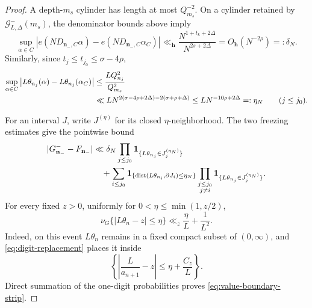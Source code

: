 \documentclass[11pt]{article}
\numberwithin{equation}{section}
\theoremstyle{definition}
\newcommand{\1}{\mathbf 1}
\begin{document}
\begin{proof}
A depth-\(m_s\) cylinder has length at most \(Q_{m_s}^{-2}\).
On a cylinder retained by
\(\mathcal G^-_{L,\Delta}(m_s)\), the denominator bounds above imply
\begin{equation}\label{eq:phase-freeze}
 \sup_{\alpha\in C}
 \left|
 e(ND_{\mathbf n_-,C}\alpha)
 -e(ND_{\mathbf n_-,C}\alpha_C)
 \right|
 \ll_{\mathbf h}
 \frac{N^{1+t_k+2\Delta}}{N^{2s+2\Delta}}
 =O_{\mathbf h}(N^{-2\rho})
 =:\delta_N.
\end{equation}
Similarly, since \(t_j\le t_{j_0}\le\sigma-4\rho\),
\begin{align}
 \sup_{\alpha\in C}
 \left|L\theta_{n_j}(\alpha)
       -L\theta_{n_j}(\alpha_C)\right|
 &\le\frac{LQ_{n_j}^2}{Q_{m_s}^2} \notag\\
 &\ll
 L N^{2(\sigma-4\rho+2\Delta)
       -2(\sigma+\rho+\Delta)}
 \le L N^{-10\rho+2\Delta}
 =:\eta_N
 \qquad(j\le j_0).
 \label{eq:value-freeze}
\end{align}

For an interval \(J\), write \(J^{(\eta)}\) for its closed
\(\eta\)-neighborhood.  The two freezing estimates give the pointwise
bound
\begin{align}
 |G^-_{\mathbf n_-}-F_{\mathbf n_-}|
 &\ll
 \delta_N
 \prod_{j\le j_0}
 \1_{\{L\theta_{n_j}\in J_j^{(\eta_N)}\}} \notag\\
 &\quad+
 \sum_{i\le j_0}
 \1_{\{\operatorname{dist}
          (L\theta_{n_i},\partial J_i)\le\eta_N\}}
 \prod_{\substack{j\le j_0\\j\ne i}}
 \1_{\{L\theta_{n_j}\in J_j^{(\eta_N)}\}}.
 \label{eq:freezing-pointwise-error}
\end{align}
For every fixed \(z>0\), uniformly for
\(0<\eta\le\min(1,z/2)\),
\begin{equation}\label{eq:value-boundary-strip}
 \nu_G\{|L\theta_n-z|\le\eta\}
 \ll_z\frac{\eta}{L}+\frac1{L^2}.
\end{equation}
Indeed, on this event \(L\theta_n\) remains in a fixed compact subset
of \((0,\infty)\), and \eqref{eq:digit-replacement} places it inside
\[
 \left\{\left|\frac{L}{a_{n+1}}-z\right|
             \le\eta+\frac{C_z}{L}\right\}.
\]
Direct summation of the one-digit probabilities proves
\eqref{eq:value-boundary-strip}.


\end{proof}
\end{document}
